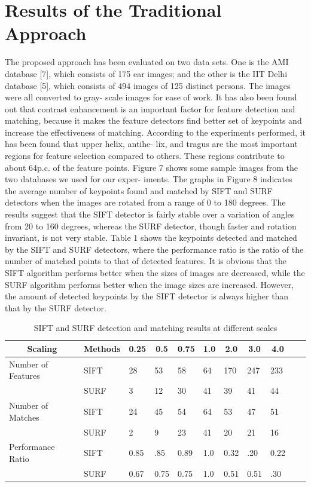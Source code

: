 \section{Results of the Traditional Approach}
The proposed approach has been evaluated on two data sets. One is the AMI database [7], which consists of 175 ear images; and the other is the IIT Delhi database [5], which consists of 494 images of 125 distinct persons. The images were all converted to gray- scale images for ease of work. It has also been found out that contrast enhancement is an important factor for feature detection and matching, because it makes the feature detectors find better set of keypoints and increase the effectiveness of matching.
According to the experiments performed, it has been found that upper helix, antihe- lix, and tragus are the most important regions for feature selection compared to others. These regions contribute to about 64p.c. of the feature points.
Figure 7 shows some sample images from the two databases we used for our exper- iments. The graphs in Figure 8 indicates the average number of keypoints found and matched by SIFT and SURF detectors when the images are rotated from a range of 0 to 180 degrees. The results suggest that the SIFT detector is fairly stable over a variation of angles from 20 to 160 degrees, whereas the SURF detector, though faster and rotation invariant, is not very stable.
Table 1 shows the keypoints detected and matched by the SIFT and SURF detectors, where the performance ratio is the ratio of the number of matched points to that of detected features. It is obvious that the SIFT algorithm performs better when the sizes of images are decreased, while the SURF algorithm performs better when the image sizes are increased. However, the amount of detected keypoints by the SIFT detector is always higher than that by the SURF detector.

\begin{table}[]
\centering
\caption{SIFT and SURF detection and matching results at different scales}
\label{table1}
\begin{tabular}{lllllllllll}
\hline
\multicolumn{1}{c}{Scaling} &           
\multicolumn{1}{c}{Methods} &          
\multicolumn{1}{c}{0.25} &     
\multicolumn{1}{c}{0.5} &     
\multicolumn{1}{c}{0.75} &     
\multicolumn{1}{c}{1.0} &     
\multicolumn{1}{c}{2.0} &     
\multicolumn{1}{c}{3.0} &     
\multicolumn{1}{c}{4.0} &       \\ \cline{1-2}
\hline
 Number of Features & SIFT  & 28  & 53  & 58 & 64 & 170  & 247  & 233   \\
 & SURF & 3  & 12  & 30 & 41 & 39 & 41 & 44   \\
 \hline
  Number of Matches & SIFT  & 24  & 45  & 54 & 64 & 53  & 47  & 51   \\
 & SURF & 2  & 9  & 23 & 41 & 20 & 21 & 16   \\
 \hline
 Performance Ratio & SIFT  & 0.85  & .85  & 0.89 & 1.0 & 0.32 & .20 & 0.22  \\
 & SURF & 0.67 & 0.75  & 0.75 & 1.0  &  0.51 & 0.51 & .30  \\
 \hline
\end{tabular}
\end{table}

